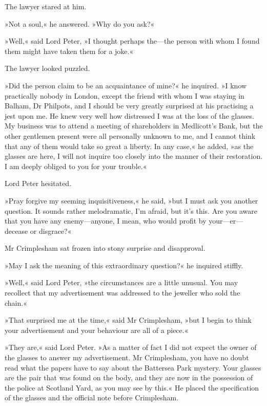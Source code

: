 The lawyer stared at him.

»Not a soul,« he answered. »Why do you ask?«

»Well,« said Lord Peter, »I thought perhaps the\allowbreak---\allowbreak the person with whom I found them might have taken them for a joke.«

The lawyer looked puzzled.

»Did the person claim to be an acquaintance of mine?« he inquired. »I know practically nobody in London, except the friend with whom I was staying in Balham, Dr Philpots, and I should be very greatly surprised at his practising a jest upon me. He knew very well how distressed I was at the loss of the glasses. My business was to attend a meeting of shareholders in Medlicott's Bank, but the other gentlemen present were all personally unknown to me, and I cannot think that any of them would take so great a liberty. In any case,« he added, »as the glasses are here, I will not inquire too closely into the manner of their restoration. I am deeply obliged to you for your trouble.«

Lord Peter hesitated.

»Pray forgive my seeming inquisitiveness,« he said, »but I must ask you another question. It sounds rather melodramatic, I'm afraid, but it's this. Are you aware that you have any enemy\allowbreak---\allowbreak anyone, I mean, who would profit by your\allowbreak---\allowbreak er---decease or disgrace?«

Mr Crimplesham sat frozen into stony surprise and disapproval.

»May I ask the meaning of this extraordinary question?« he inquired stiffly.

»Well,« said Lord Peter, »the circumstances are a little unusual. You may recollect that my advertisement was addressed to the jeweller who sold the chain.«

»That surprised me at the time,« said Mr Crimplesham, »but I begin to think your advertisement and your behaviour are all of a piece.«

»They are,« said Lord Peter. »As a matter of fact I did not expect the owner of the glasses to answer my advertisement. Mr Crimplesham, you have no doubt read what the papers have to say about the Battersea Park mystery. Your glasses are the pair that was found on the body, and they are now in the possession of the police at Scotland Yard, as you may see by this.« He placed the specification of the glasses and the official note before Crimplesham.

